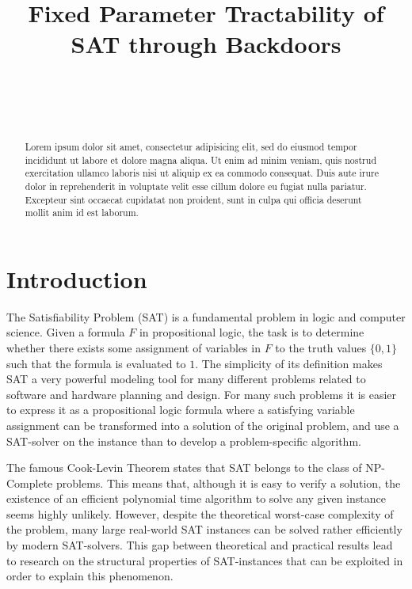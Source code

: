 \documentclass[11pt,a4paper]{article}
\title{Fixed Parameter Tractability of SAT through Backdoors}
\author{
 \authorname{Rupert Ettrich} \\
 \studentnumber{01129393} \\
 \curriculum{066 931 Logic and Computation} \\
 \email{rupert.ettrich@gmail.com}
}
\theoremstyle{definition}
\theoremstyle{proposition}
\begin{document}
\maketitle

\begin{abstract}
Lorem ipsum dolor sit amet, consectetur adipisicing elit, sed do eiusmod tempor incididunt ut labore et dolore magna aliqua. Ut enim ad minim veniam, quis nostrud exercitation ullamco laboris nisi ut aliquip ex ea commodo consequat. Duis aute irure dolor in reprehenderit in voluptate velit esse cillum dolore eu fugiat nulla pariatur. Excepteur sint occaecat cupidatat non proident, sunt in culpa qui officia deserunt mollit anim id est laborum. 
\end{abstract}

\section{Introduction}

The Satisfiability Problem (SAT) is a fundamental problem in logic and computer science. Given a formula $F$ in propositional logic, the task is to determine whether there exists some assignment of variables in $F$ to the truth values $\{0,1\}$ such that the formula is evaluated to $1$. The simplicity of its definition makes SAT a very powerful modeling tool for many different problems related to software and hardware planning and design. For many such problems it is easier to express it as a propositional logic formula where a satisfying variable assignment can be transformed into a solution of the original problem, and use a SAT-solver on the instance than to develop a problem-specific algorithm. 

The famous Cook-Levin Theorem \cite{Cook71, Levin73} states that SAT belongs to the class of NP-Complete problems. This means that, although it is easy to verify a solution, the existence of an efficient polynomial time algorithm to solve any given instance seems highly unlikely. However, despite the theoretical worst-case complexity of the problem, many large real-world SAT instances can be solved rather efficiently by modern SAT-solvers. This gap between theoretical and practical results lead to research on the structural properties of SAT-instances that can be exploited in order to explain this phenomenon. 
\end{document}
